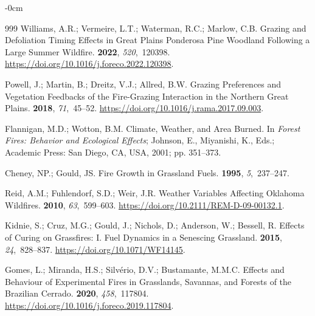 \documentclass[fire,article,accept,oneauthor,pdftex]{Definitions/mdpi}
\begin{document}
\begin{adjustwidth}{-\extralength}{0cm}
\begin{thebibliography}{999}
Williams, A.R.; Vermeire, L.T.; Waterman, R.C.; Marlow, C.B.
\newblock Grazing and Defoliation Timing Effects in {{Great Plains}} Ponderosa
  Pine Woodland Following a Large Summer Wildfire.
 {\bf 2022}, {\em 520},~120398.
\newblock
  \url{https://doi.org/10.1016/j.foreco.2022.120398}.

Powell, J.; Martin, B.; Dreitz, V.J.; Allred, B.W.
\newblock Grazing {{Preferences}} and {{Vegetation Feedbacks}} of the
  {{Fire-Grazing Interaction}} in the {{Northern Great Plains}}.
 {\bf 2018}, {\em 71},~45--52.
\newblock
  \url{https://doi.org/10.1016/j.rama.2017.09.003}.

Flannigan, M.D.; Wotton, B.M.
\newblock Climate, Weather, and Area Burned. In {\em Forest Fires: {{Behavior}}
  and Ecological Effects}; Johnson, E., Miyanishi, K., Eds.; Academic Press:
  San Diego, CA, USA, 2001; pp. 351--373.

Cheney, {\relax NP}.; Gould, {\relax JS}.
\newblock Fire Growth in Grassland Fuels.
 {\bf 1995}, {\em
  5},~237--247.

Reid, A.M.; Fuhlendorf, S.D.; Weir, J.R.
\newblock Weather Variables Affecting {{Oklahoma}} Wildfires.
 {\bf 2010}, {\em 63},~599--603.
\newblock
  \url{https://doi.org/10.2111/REM-D-09-00132.1}.

Kidnie, S.; Cruz, M.G.; Gould, J.; Nichols, D.; Anderson, W.; Bessell, R.
\newblock Effects of Curing on Grassfires: {{I}}. {{Fuel}} Dynamics in a
  Senescing Grassland.
 {\bf 2015}, {\em
  24},~828--837.
\newblock
  \url{https://doi.org/10.1071/WF14145}.

Gomes, L.; Miranda, H.S.; Silv{\'e}rio, D.V.; Bustamante, M.M.C.
\newblock Effects and Behaviour of Experimental Fires in Grasslands, Savannas,
  and Forests of the {{Brazilian Cerrado}}.
 {\bf 2020}, {\em 458},~117804.
\newblock
  \url{https://doi.org/10.1016/j.foreco.2019.117804}.

\end{thebibliography}
\PublishersNote{}

\end{adjustwidth}
\end{document}
